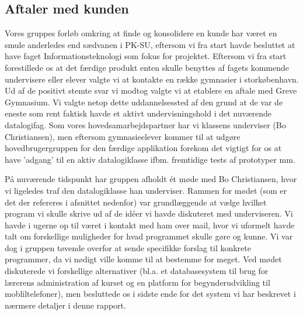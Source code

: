 \documentclass[10pt,a4paper,danish]{article}
\begin{document}
\subsection{Aftaler med kunden}
Vores gruppes forløb omkring at finde og konsolidere en kunde har været en smule anderledes end sædvanen i PK-SU, eftersom vi fra start havde besluttet at have faget Informationsteknologi som fokus for projektet. Eftersom vi fra start forestillede os at det færdige produkt enten skulle benyttes af fagets kommende undervisere eller elever valgte vi at kontakte en række gymnasier i storkøbenhavn. Ud af de positivt stemte svar vi modtog valgte vi at etablere en aftale med Greve Gymnasium. Vi valgte netop dette uddannelsessted af den grund at de var de eneste som rent faktisk havde et aktivt undervisningshold i det nuværende datalogifag. Som vores hovedsamarbejdspartner har vi klassens underviser (Bo Christiansen), men eftersom gymnasieelever kommer til at udgøre hovedbrugergruppen for den færdige applikation forekom det vigtigt for os at have 'adgang' til en aktiv datalogiklasse ifbm. fremtidige tests af prototyper mm.

På nuværende tidspunkt har gruppen afholdt ét møde med Bo Christiansen, hvor vi ligeledes traf den datalogiklasse han underviser. Rammen for mødet (som er det der refereres i afsnittet nedenfor) var grundlæggende at vælge hvilket program vi skulle skrive ud af de idéer vi havde diskuteret med underviseren. Vi havde i ugerne op til været i kontakt med ham over mail, hvor vi uformelt havde talt om forskellige muligheder for hvad programmet skulle gøre og kunne. Vi var dog i gruppen tøvende overfor at sende specifikke forslag til konkrete programmer, da vi nødigt ville komme til at bestemme for meget. Ved mødet diskuterede vi forskellige alternativer (bl.a. et databasesystem til brug for lærerens administration af kurset og en platform for begynderudvikling til mobliltelefoner), men besluttede os i sidste ende for det system vi har beskrevet i nærmere detaljer i denne rapport.  
\end{document}
